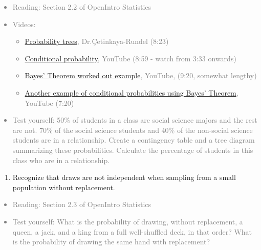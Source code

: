 \documentclass[11pt]{article}
\newcommand{\gray}[1]{\textcolor{gray}{#1}}
\begin{document}
\gray{
{\it
\vspace{-0.75cm}
\begin{itemize}
\renewcommand{\labelitemi}{{\textcolor{dark}{$\ast$}}}
\item Reading: Section 2.2 of OpenIntro Statistics
\item Videos:
\begin{itemize}
\item \href{http://www.youtube.com/watch?v=HxEz4ZHUY5Y}{Probability trees}, Dr.\c{C}etinkaya-Rundel (8:23)
\item \href{http://www.youtube.com/watch?feature=endscreen&NR=1&v=cwADSMeiIoE}{Conditional probability}, YouTube (8:59 - watch from 3:33 onwards)
\item \href{http://www.youtube.com/watch?v=2Df1sDAyRvQ}{Bayes' Theorem worked out example}, YouTube, (9:20, somewhat lengthy) 
\item \href{http://www.youtube.com/watch?v=E2pOJwSwWDk}{Another example of conditional probabilities using Bayes' Theorem}, YouTube (7:20)
\end{itemize}
\item Test yourself: 50\% of students in a class are social science majors and the rest are not. 70\% of the social science students and 40\% of the non-social science students are in a relationship. Create a contingency table and a tree diagram summarizing these probabilities. Calculate the percentage of students in this class who are in a relationship.
\end{itemize}
}}

%

\vspace{0.25cm}

%

\begin{enumerate}[resume]
\renewcommand\labelenumi{\textcolor{light}{\textbf{LO \theenumi.}}}

\item Recognize that draws are not independent when sampling from a small population without replacement.

\end{enumerate} 

\gray{
{\it
\vspace{-0.75cm}
\begin{itemize}
\renewcommand{\labelitemi}{{\textcolor{dark}{$\ast$}}}
\item Reading: Section 2.3 of OpenIntro Statistics
\item Test yourself: What is the probability of drawing, without replacement, a queen, a jack, and a king from a full well-shuffled deck, in that order? What is the probability of drawing the same hand with replacement?
\end{itemize}
}}
\end{document}
